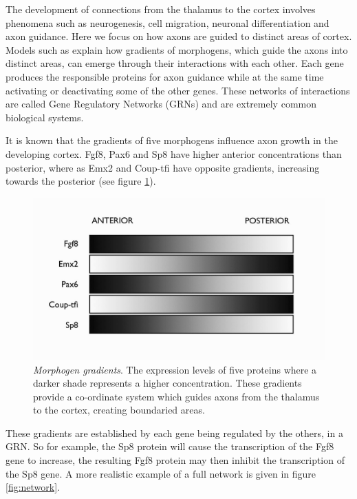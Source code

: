 \documentclass[a4paper,11pt]{article}
\begin{document}
The development of connections from the thalamus to the cortex involves phenomena such as neurogenesis, cell migration, neuronal differentiation and axon guidance. Here we focus on how axons are guided to distinct areas of cortex. Models such as \cite{Karbowski2004} explain how gradients of morphogens, which guide the axons into distinct areas, can emerge through their interactions with each other. Each gene produces the responsible proteins for axon guidance while at the same time activating or deactivating some of the other genes. These networks of interactions are called Gene Regulatory Networks (GRNs) and are extremely common biological systems.\par

It is known that the gradients of five morphogens influence axon growth in the developing cortex. Fgf8, Pax6 and Sp8 have higher anterior concentrations than posterior, where as Emx2 and Coup-tfi have opposite gradients, increasing towards the posterior (see figure \ref{fig:gradients}).\par

\begin{figure}[h]
  \centering
  \includegraphics[width=\linewidth]{gradients.jpg}
  \caption{\emph{Morphogen gradients}. The expression levels of five proteins where a darker shade represents a higher concentration. These gradients provide a co-ordinate system which guides axons from the thalamus to the cortex, creating boundaried areas.}
  \label{fig:gradients}
\end{figure}

These gradients are established by each gene being regulated by the others, in a GRN. So for example, the Sp8 protein will cause the transcription of the Fgf8 gene to increase, the resulting Fgf8 protein may then inhibit the transcription of the Sp8 gene. A more realistic example of a full network is given in figure \ref{fig:network}.\par
\end{document}
